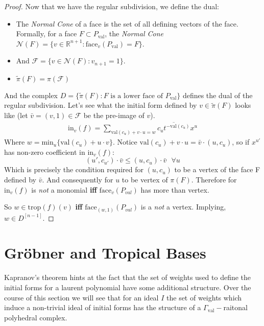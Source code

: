 \begin{proof}
       Now that we have the regular subdivision, we define the dual:
       \begin{itemize}
           \item The \textit{Normal Cone} of a face is the set of all defining vectors of the face.
               Formally, for a face $F \subset P_{\text{val}}$, the \textit{Normal Cone} $\mathcal{N}(F) = \{v \in \mathbb{R}^{n+1}: \text{face}_v(P_{\text{val}}) = F\}$.
           \item And $\mathcal{F} = \{v \in \mathcal{N}(F): v_{n+1} = 1\}$.
           \item $\tilde{\pi}(F) = \pi(\mathcal{F})$
       \end{itemize}
       And the complex $D = \{\tilde{\pi}(F) : F \text{ is a lower face of }P_{\text{val}}\}$ defines the dual of the regular subdivision. 
       Let's see what the initial form defined by $v \in \tilde{\pi}(F)$ looks like (let $\bar{v} = (v,1) \in \mathcal{F}$ be the pre-image of $v$).
       \begin{align*}
           \text{in}_v(f) = \sum_{\text{val}(c_u) + v \cdot u = w} \overline{c_u t^{-\text{val}(c_u)}} x^u
       \end{align*}
       Where $w = \text{min}_{u}\{\text{val}(c_u) + u\cdot v\}$. 
       Notice $\text{val}(c_u) + v \cdot u = \bar v \cdot (u,c_u)$, 
       so if $x^{u'}$ has non-zero coefficient in $\text{in}_v(f)$: 
       \begin{equation*}
           (u',c_{u'})\cdot \bar{v} \leq (u,c_u) \cdot \bar{v}~~~\forall u
       \end{equation*}
       Which is precisely the condition required for $(u,c_u)$ to be a vertex of the face F defined by $\bar v$. 
       And consequently for $u$ to be vertex of $\pi(F)$. 
       Therefore for $\text{in}_{v}(f)$ is \textit{not} a monomial \textbf{iff} $\text{face}_v(P_{val})$ has more than vertex.
       \par So $w\in \text{trop}(f)(v)$ \textbf{iff} $\text{face}_{(w,1)}(P_{val})$ is a \textit{not} a vertex. 
       Implying, $w \in D^{[n-1]}$.
   \end{proof}

\section{Gr\"{o}bner and Tropical Bases}  
Kapranov's theorem hints at the fact that the set of weights used to define the initial forms for a laurent polynomial have some additional structure. 
Over the course of this section we will see that for an ideal $I$ the set of weights which induce a non-trivial ideal of initial forms has the structure of a $\Gamma_{\text{val}}-$raitonal polyhedral complex.


